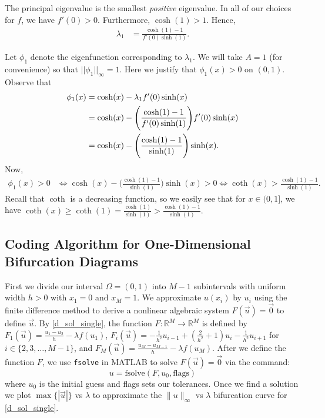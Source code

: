 \documentclass[12pt, reqno]{amsart}
\numberwithin{equation}{section}
\begin{document}
The principal eigenvalue is the smallest \emph{positive} eigenvalue. In all of our choices for $f$, we have $f'(0) > 0$. Furthermore, $\cosh(1) > 1$. Hence, 
\begin{align} \label{lambda1_single}
    \lambda_1 &= \displaystyle \frac{\cosh(1)-1}{f'(0) \sinh(1)}.
\end{align}

Let $\phi_1$ denote the eigenfunction corresponding to $\lambda_1$. We will take $A = 1$ (for convenience) so that $||\phi_1||_{\infty} = 1$. Here we justify that $\phi_1(x) > 0$ on $(0,1)$. Observe that
\begin{align} \label{single_eigenfunction}
\phi_1(x)
    &= \cosh(x) - \lambda_1 f'(0) \sinh(x) \notag \\
    &= \cosh(x) - \Bigg( \frac{\cosh(1)-1}{f'(0) \sinh(1)} \Bigg) f'(0) \sinh(x) \notag \\
    &= \cosh(x) - \Bigg( \frac{\cosh(1)-1}{\sinh(1)} \Bigg) \sinh(x).
\end{align}
Now,
\begin{align*}
\phi_1(x) > 0
    &\iff \cosh(x) - \Bigg( \frac{\cosh(1)-1}{\sinh(1)} \Bigg) \sinh(x) > 0
    \iff \coth(x) > \frac{\cosh(1)-1}{\sinh(1)}.
\end{align*}
Recall that $\coth$ is a decreasing function, so we easily see that for $x \in (0,1]$, we have $\coth(x) 
    \geq \coth(1) 
    = \displaystyle \frac{\cosh(1)}{\sinh(1)} > \frac{\cosh(1)-1}{\sinh(1)}.$


\subsection{Coding Algorithm for One-Dimensional Bifurcation Diagrams}

First we divide our interval $\Omega = (0,1)$ into $M-1$ subintervals with uniform width $h>0$ with $x_1 = 0$ and $x_M = 1$. We approximate  $u(x_i)$ by $u_i$ using the finite difference method to derive a nonlinear algebraic system $F(\vec{u})=\vec{0}$ to define $\vec{u}$. By \eqref{d_sol_single}, the function $F: \mathbb{R}^M \to \mathbb{R}^M$ is defined by $F_1(\vec{u})=\frac{u_1-u_2}{h}-\lambda f (u_1)$, $F_i(\vec{u})=-\frac{1}{h^2}u_{i-1}+(\frac{2}{h^2}+1)u_i-\frac{1}{h^2}u_{i+1}$ for $i \in \{2,3,\ldots , M-1\}$, and $F_M(\vec{u})=\frac{u_M-u_{M-1}}{h}-\lambda f(u_M)$. After we define the function $F$, we use \texttt{fsolve} in MATLAB to solve $F(\vec{u})=\vec{0}$ via the command:
$$u=\text{fsolve}(F,u_0,\text{flags})$$
where $u_0$ is the initial guess and flags sets our tolerances. Once we find a solution we plot $\max\{|\vec{u}|\}$ vs $\lambda$ to approximate the  $\|u\|_{\infty}$ vs $\lambda$ bifurcation curve for \eqref{d_sol_single}.
\end{document}
